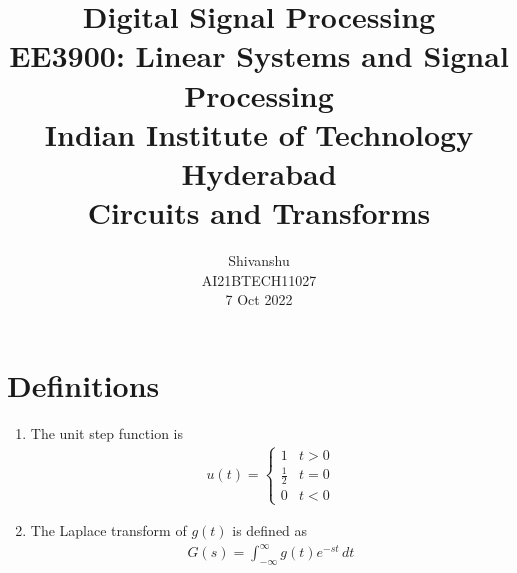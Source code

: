 \documentclass[journal,12pt,twocolumn]{IEEEtran}
\numberwithin{equation}{section}
\renewcommand\thesection{\arabic{section}}
\begin{document}
\pagecolor{cyan!20!white}
                             
\title{ Digital Signal Processing \\ \Large EE3900: Linear Systems and Signal Processing \\ \large Indian Institute of Technology Hyderabad \\ \vspace*{12pt} \textbf{Circuits and Transforms}}
\author{Shivanshu\\ \normalsize AI21BTECH11027 \\ \vspace*{20pt} \normalsize 7 Oct 2022  }
 \maketitle 
 \tableofcontents
 \section{Definitions}
\begin{enumerate}[label=\arabic*.,ref=\thesection.\theenumi]
\item The unit step function is 
\begin{align}
\label{eq:unit-step}
u(t) =
\begin{cases}
1 & t > 0
\\
	\frac{1}{2} & t = 0
\\
0 & t < 0
\end{cases}
\end{align}
\item The Laplace transform of $g(t)$ is defined as 
\begin{align}
	G(s) = \int_{-\infty}^{\infty} g(t) e^{-st}\, dt
\end{align}
 \end{enumerate}
\end{document}
